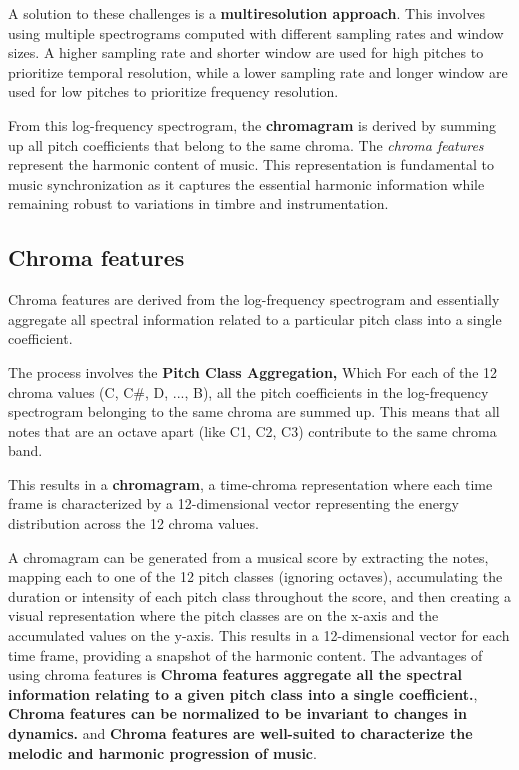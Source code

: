 \documentclass[a4paper, 9pt, twocolumn]{extarticle}
\begin{document}
A solution to these challenges is a \textbf{multiresolution approach}.
This involves using multiple spectrograms computed with different
sampling rates and window sizes. A higher sampling rate and shorter
window are used for high pitches to prioritize temporal resolution,
while a lower sampling rate and longer window are used for low pitches
to prioritize frequency resolution.

From this log-frequency spectrogram, the \textbf{chromagram} is derived
by summing up all pitch coefficients that belong to the same chroma. The
\emph{chroma features} represent the harmonic content of music. This
representation is fundamental to music synchronization as it captures
the essential harmonic information while remaining robust to variations
in timbre and instrumentation.
\subsection{Chroma features}
Chroma features are derived from the log-frequency spectrogram
and essentially aggregate all spectral information related to a
particular pitch class into a single coefficient.

The process involves the \textbf{Pitch Class Aggregation,} Which For
each of the 12 chroma values (C, C\#, D, ..., B), all the pitch
coefficients in the log-frequency spectrogram belonging to the same
chroma are summed up. This means that all notes that are an octave apart
(like C1, C2, C3) contribute to the same chroma band.

This results in a \textbf{chromagram}, a time-chroma representation
where each time frame is characterized by a 12-dimensional vector
representing the energy distribution across the 12 chroma values.

A chromagram can be generated from a musical score by extracting the notes, mapping each to one of the 12 pitch classes (ignoring octaves), accumulating the duration or intensity of each pitch class throughout the score, and then creating a visual representation where the pitch classes are on the x-axis and the accumulated values on the y-axis. This results in a 12-dimensional vector for each time frame, providing a snapshot of the harmonic content.
The advantages of using chroma features is \textbf{Chroma features aggregate all the spectral information relating to a given pitch class into a single coefficient.},
\textbf{Chroma features can be normalized to be invariant to changes in dynamics.} and
\textbf{Chroma features are well-suited to characterize the melodic and harmonic progression of music}.
\end{document}

